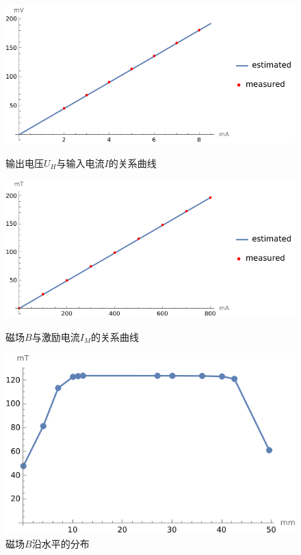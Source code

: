\documentclass[UTF8,a4paper]{article}%
\begin{document}
\begin{figure}[H]
    \centering
    \begin{minipage}[t]{0.45\linewidth}
        \centering
        \includegraphics[width=0.8\linewidth]{hall-voltage.png}
        \caption{输出电压$U_H$与输入电流$I$的关系曲线}
        \label{fg:hall-voltage}
    \end{minipage}
    \begin{minipage}[t]{0.45\linewidth}
        \centering
        \includegraphics[width=0.8\linewidth]{ampere-tesla.png}
        \caption{磁场$B$与激励电流$I_M$的关系曲线}
        \label{fg:ampere-tesla}
    \end{minipage}
    \begin{minipage}[t]{0.45\linewidth}
        \centering
        \includegraphics[width=0.8\linewidth]{m-tesla.png}
        \caption{磁场$B$沿水平的分布}
        \label{fg:m-tesla}
    \end{minipage}

\end{figure}
\end{document}
